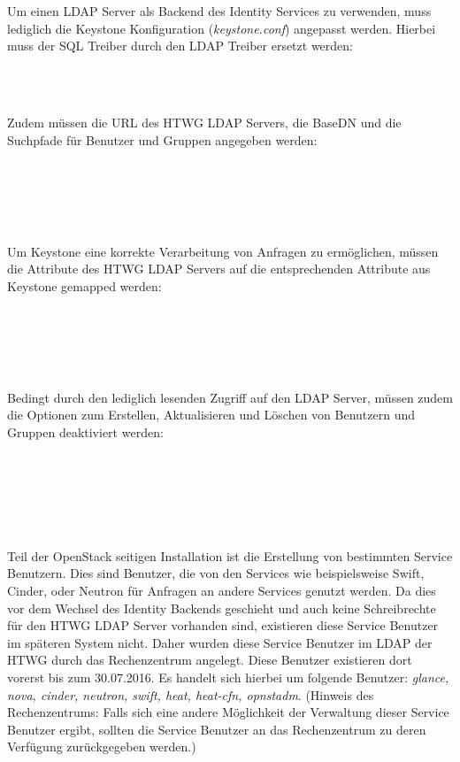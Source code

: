 Um einen LDAP Server als Backend des Identity Services zu verwenden, muss lediglich die Keystone Konfiguration (\emph{keystone.conf}) angepasst werden. Hierbei muss der SQL Treiber durch den LDAP Treiber ersetzt werden:

\code{[identity]}\\
\\

Zudem müssen die URL des HTWG LDAP Servers, die BaseDN und die Suchpfade für Benutzer und Gruppen angegeben werden:

\code{[ldap]}\\
\\
\\
\\

Um Keystone eine korrekte Verarbeitung von Anfragen zu ermöglichen, müssen die Attribute des HTWG LDAP Servers auf die entsprechenden Attribute aus Keystone gemapped werden:

\\
\\
\\
\\

Bedingt durch den lediglich lesenden Zugriff auf den LDAP Server, müssen zudem die Optionen zum Erstellen, Aktualisieren und Löschen von Benutzern und Gruppen deaktiviert werden:

\\
\\

\\
\\

Teil der OpenStack seitigen Installation ist die Erstellung von bestimmten Service Benutzern. Dies sind Benutzer, die von den Services wie beispielsweise Swift, Cinder, oder Neutron für Anfragen an andere Services genutzt werden. Da dies vor dem Wechsel des Identity Backends geschieht und auch keine Schreibrechte für den HTWG LDAP Server vorhanden sind, existieren diese Service Benutzer im späteren System nicht. Daher wurden diese Service Benutzer im LDAP der HTWG durch das Rechenzentrum angelegt. Diese Benutzer existieren dort vorerst bis zum 30.07.2016. Es handelt sich hierbei um folgende Benutzer:
\emph{glance, nova, cinder, neutron, swift, heat, heat-cfn, opnstadm}. (Hinweis des Rechenzentrums: Falls sich eine andere Möglichkeit der Verwaltung dieser Service Benutzer ergibt, sollten die Service Benutzer an das Rechenzentrum zu deren Verfügung zurückgegeben werden.)


